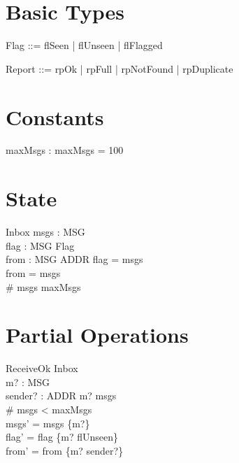 \documentclass{article}
\begin{document}
\section{Basic Types}

\begin{zed}
\end{zed}

\begin{zed}
  Flag ::= flSeen | flUnseen | flFlagged
\end{zed}

\begin{zed}
  Report ::= rpOk | rpFull | rpNotFound | rpDuplicate
\end{zed}

\section{Constants}

\begin{axdef}
  maxMsgs : \nat
\where
  maxMsgs = 100
\end{axdef}

\section{State}

\begin{schema}{Inbox}
  msgs : \power MSG \\
  flag : MSG \pfun Flag \\
  from : MSG \pfun ADDR
\where
  \dom flag = msgs \\
  \dom from = msgs \\
  \# msgs \leq maxMsgs
\end{schema}

\section{Partial Operations}

\begin{schema}{ReceiveOk}
  \Delta Inbox \\
  m? : MSG \\
  sender? : ADDR
\where
  m? \notin msgs \\
  \# msgs < maxMsgs \\
  msgs' = msgs \cup \{m?\} \\
  flag' = flag \cup \{m? \mapsto flUnseen\} \\
  from' = from \cup \{m? \mapsto sender?\}
\end{schema}
\end{document}
